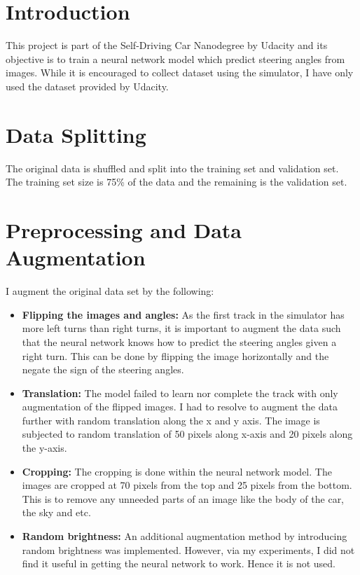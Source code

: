 \documentclass[12pt,twoside]{article}
\begin{document}



\section{Introduction}
This project is part of the Self-Driving Car Nanodegree by Udacity and its objective is to train a neural network model which predict steering angles from images. While it is encouraged to collect dataset using the simulator, I have only used the dataset provided by Udacity.

\section{Data Splitting}
The original data is shuffled and split into the training set and validation set. The training set size is 75\% of the data and the remaining is the validation set. 

\section{Preprocessing and Data Augmentation}
I augment the original data set by the following:
\begin{itemize}
	\item \textbf{Flipping the images and angles: } As the first track in the simulator has more left turns than right turns, it is important to augment the data such that the neural network knows how to predict the steering angles given a right turn. This can be done by flipping the image horizontally and the negate the sign of the steering angles.
	
	\item \textbf{Translation:} The model failed to learn nor complete the track with only augmentation of the flipped images. I had to resolve to augment the data further with random translation along the x and y axis. The image is subjected to random translation of 50 pixels along x-axis and 20 pixels along the y-axis.

	\item \textbf{Cropping:} The cropping is done within the neural network model. The images are cropped at 70 pixels from the top and 25 pixels from the bottom. This is to remove any unneeded parts of an image like the body of the car, the sky and etc.
	
	\item \textbf{Random brightness:} An additional augmentation method by introducing random brightness was implemented. However, via my experiments, I did not find it useful in getting the neural network to work. Hence it is not used.
\end{itemize}
\end{document}
